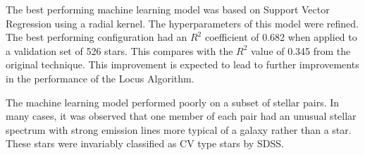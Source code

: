\documentclass[preprint, 3p,
authoryear]{elsarticle} %
\begin{document}
The best performing machine learning model was based on Support Vector
Regression using a radial kernel. The hyperparameters of this model were
refined. The best performing configuration had an \(R^2\) coefficient of
0.682 when applied to a validation set of 526 stars. This compares with
the \(R^2\) value of 0.345 from the original technique. This improvement
is expected to lead to further improvements in the performance of the
Locus Algorithm.

The machine learning model performed poorly on a subset of stellar
pairs. In many cases, it was observed that one member of each pair had
an unusual stellar spectrum with strong emission lines more typical of a
galaxy rather than a star. These stars were invariably classified as CV
type stars by SDSS.

\renewcommand\refname{References}

\end{document}
